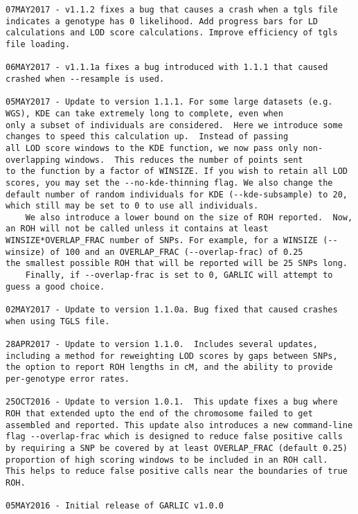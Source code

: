 \documentclass[12pt]{article}%
\begin{document}
\begin{lstlisting}
07MAY2017 - v1.1.2 fixes a bug that causes a crash when a tgls file indicates a genotype has 0 likelihood. Add progress bars for LD calculations and LOD score calculations. Improve efficiency of tgls file loading.

06MAY2017 - v1.1.1a fixes a bug introduced with 1.1.1 that caused crashed when --resample is used.

05MAY2017 - Update to version 1.1.1. For some large datasets (e.g. WGS), KDE can take extremely long to complete, even when
only a subset of individuals are considered.  Here we introduce some changes to speed this calculation up.  Instead of passing
all LOD score windows to the KDE function, we now pass only non-overlapping windows.  This reduces the number of points sent
to the function by a factor of WINSIZE. If you wish to retain all LOD scores, you may set the --no-kde-thinning flag. We also change the default number of random individuals for KDE (--kde-subsample) to 20, which still may be set to 0 to use all individuals. 
	We also introduce a lower bound on the size of ROH reported.  Now, an ROH will not be called unless it contains at least
WINSIZE*OVERLAP_FRAC number of SNPs. For example, for a WINSIZE (--winsize) of 100 and an OVERLAP_FRAC (--overlap-frac) of 0.25
the smallest possible ROH that will be reported will be 25 SNPs long.
	Finally, if --overlap-frac is set to 0, GARLIC will attempt to guess a good choice.

02MAY2017 - Update to version 1.1.0a. Bug fixed that caused crashes when using TGLS file. 

28APR2017 - Update to version 1.1.0.  Includes several updates, including a method for reweighting LOD scores by gaps between SNPs, the option to report ROH lengths in cM, and the ability to provide per-genotype error rates.

25OCT2016 - Update to version 1.0.1.  This update fixes a bug where ROH that extended upto the end of the chromosome failed to get assembled and reported. This update also introduces a new command-line flag --overlap-frac which is designed to reduce false positive calls by requiring a SNP be covered by at least OVERLAP_FRAC (default 0.25) proportion of high scoring windows to be included in an ROH call.  This helps to reduce false positive calls near the boundaries of true ROH.

05MAY2016 - Initial release of GARLIC v1.0.0
\end{lstlisting}


\end{document}
